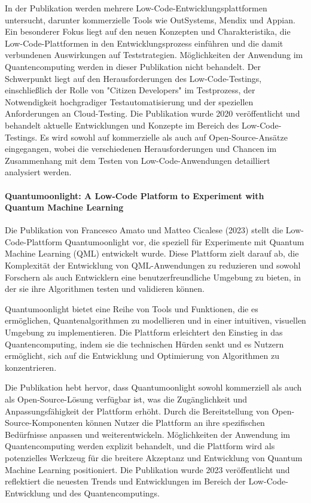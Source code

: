 In der Publikation werden mehrere Low-Code-Entwicklungsplattformen untersucht, darunter kommerzielle Tools wie OutSystems, 
Mendix und Appian. Ein besonderer Fokus liegt auf den neuen Konzepten und Charakteristika, die Low-Code-Plattformen in 
den Entwicklungsprozess einführen und die damit verbundenen Auswirkungen auf Teststrategien. Möglichkeiten der Anwendung 
im Quantencomputing werden in dieser Publikation nicht behandelt. Der Schwerpunkt liegt auf den Herausforderungen 
des Low-Code-Testings, einschließlich der Rolle von "Citizen Developers" im Testprozess, der Notwendigkeit hochgradiger 
Testautomatisierung und der speziellen Anforderungen an Cloud-Testing. Die Publikation wurde 2020 veröffentlicht und 
behandelt aktuelle Entwicklungen und Konzepte im Bereich des Low-Code-Testings. Es wird sowohl auf kommerzielle als 
auch auf Open-Source-Ansätze eingegangen, wobei die verschiedenen Herausforderungen und Chancen im Zusammenhang mit 
dem Testen von Low-Code-Anwendungen detailliert analysiert werden.

\paragraph{Quantumoonlight: A Low-Code Platform to Experiment with Quantum Machine Learning}

Die Publikation von Francesco Amato und Matteo Cicalese (2023) stellt die Low-Code-Plattform Quantumoonlight vor, 
die speziell für Experimente mit Quantum Machine Learning (QML) entwickelt wurde. Diese Plattform zielt darauf ab, 
die Komplexität der Entwicklung von QML-Anwendungen zu reduzieren und sowohl Forschern als auch Entwicklern eine 
benutzerfreundliche Umgebung zu bieten, in der sie ihre Algorithmen testen und validieren können.

Quantumoonlight bietet eine Reihe von Tools und Funktionen, die es ermöglichen, Quantenalgorithmen zu modellieren und in 
einer intuitiven, visuellen Umgebung zu implementieren. Die Plattform erleichtert den Einstieg in das Quantencomputing, 
indem sie die technischen Hürden senkt und es Nutzern ermöglicht, sich auf die Entwicklung und Optimierung von Algorithmen zu konzentrieren. 

Die Publikation hebt hervor, dass Quantumoonlight sowohl kommerziell als auch als Open-Source-Lösung verfügbar ist, 
was die Zugänglichkeit und Anpassungsfähigkeit der Plattform erhöht. Durch die Bereitstellung von Open-Source-Komponenten 
können Nutzer die Plattform an ihre spezifischen Bedürfnisse anpassen und weiterentwickeln. Möglichkeiten der 
Anwendung im Quantencomputing werden explizit behandelt, und die Plattform wird als potenzielles Werkzeug 
für die breitere Akzeptanz und Entwicklung von Quantum Machine Learning positioniert. Die Publikation wurde 2023 
veröffentlicht und reflektiert die neuesten Trends und Entwicklungen im Bereich der Low-Code-Entwicklung und des Quantencomputings.

